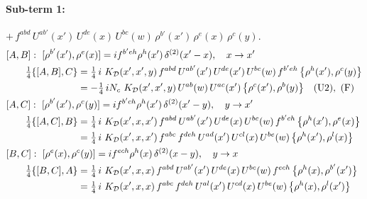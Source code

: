 \documentclass[10pt]{article}
\numberwithin{equation}{section}
\begin{document}
\paragraph{Sub-term 1:} $+\,f^{abd}\,U^{ab'}(x')\,U^{de}(x)\,U^{bc}(w)\,\rho^{b'}(x')\,\rho^{e}(x)\,\rho^{c}(y)$.
\begin{align}
&[A,B]:\ [\rho^{b'}(x'),\rho^{e}(x)]=i f^{b'eh}\rho^{h}(x')\,\delta^{(2)}(x'-x),\quad x\to x'\notag\\
&\qquad \tfrac14\{[A,B],C\}=\tfrac14\,i\,\,K_{\mathcal D}(x',x',y)\,f^{abd}\,U^{ab'}(x')\,U^{de}(x')\,U^{bc}(w)\,f^{b'eh}\,\big\{\rho^{h}(x'),\rho^{c}(y)\big\}\notag\\
&\qquad\phantom{\tfrac14\{[A,B],C\}}=-\tfrac14\,i N_{c}\,\,K_{\mathcal D}(x',x',y)\,U^{ab}(w)\,U^{ac}(x')\,\big\{\rho^{c}(x'),\rho^{b}(y)\big\}\quad\text{(U2)},\ \text{(F)}
\label{eq:D-1-AB}\\
&[A,C]:\ [\rho^{b'}(x'),\rho^{c}(y)]=i f^{b'ch}\rho^{h}(x')\,\delta^{(2)}(x'-y),\quad y\to x'\notag\\
&\qquad \tfrac14\{[A,C],B\}=\tfrac14\,i\,\,K_{\mathcal D}(x',x,x')\,f^{abd}\,U^{ab'}(x')\,U^{de}(x)\,U^{bc}(w)\,f^{b'ch}\,\big\{\rho^{h}(x'),\rho^{e}(x)\big\}\notag\\
&\qquad\phantom{\tfrac14\{[A,C],B\}}=\tfrac14\,i\,\,K_{\mathcal D}(x',x,x')\,f^{abc}\,f^{deh}\,U^{ad}(x')\,U^{cl}(x)\,U^{be}(w)\,\big\{\rho^{h}(x'),\rho^{l}(x)\big\}
\label{eq:D-1-AC}\\
&[B,C]:\ [\rho^{e}(x),\rho^{c}(y)]=i f^{ech}\rho^{h}(x)\,\delta^{(2)}(x-y),\quad y\to x\notag\\
&\qquad \tfrac14\{[B,C],A\}=\tfrac14\,i\,\,K_{\mathcal D}(x',x,x)\,f^{abd}\,U^{ab'}(x')\,U^{de}(x)\,U^{bc}(w)\,f^{ech}\,\big\{\rho^{h}(x),\rho^{b'}(x')\big\}\notag\\
&\qquad\phantom{\tfrac14\{[B,C],A\}}=\tfrac14\,i\,\,K_{\mathcal D}(x',x,x)\,f^{abc}\,f^{deh}\,U^{al}(x')\,U^{cd}(x)\,U^{be}(w)\,\big\{\rho^{h}(x),\rho^{l}(x')\big\}
\label{eq:D-1-BC}
\end{align}
\end{document}
